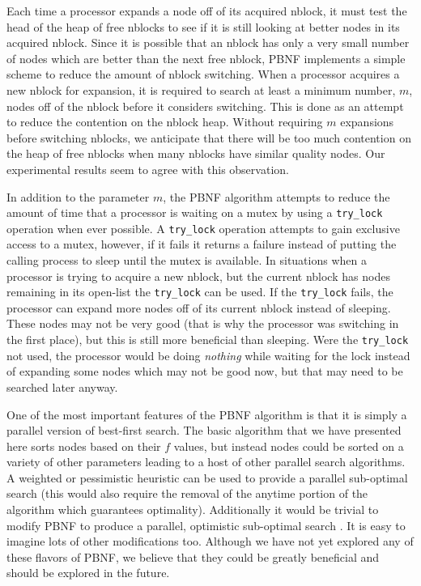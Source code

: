 \documentclass{article}
\begin{document}
 Each time a processor expands a node off of its acquired nblock, it
 must test the head of the heap of free nblocks to see if it is still
 looking at better nodes in its acquired nblock.  Since it is possible
 that an nblock has only a very small number of nodes which are better
 than the next free nblock, PBNF implements a simple scheme to reduce
 the amount of nblock switching.  When a processor acquires a new
 nblock for expansion, it is required to search at least a minimum
 number, $m$, nodes off of the nblock before it considers switching.
 This is done as an attempt to reduce the contention on the nblock
 heap.  Without requiring $m$ expansions before switching nblocks, we
 anticipate that there will be too much contention on the heap of free
 nblocks when many nblocks have similar quality nodes.  Our
 experimental results seem to agree with this observation.

 In addition to the parameter $m$, the PBNF algorithm attempts to
 reduce the amount of time that a processor is waiting on a mutex by
 using a \texttt{try\_lock} operation when ever possible.  A
 \texttt{try\_lock} operation attempts to gain exclusive access to a
 mutex, however, if it fails it returns a failure instead of putting
 the calling process to sleep until the mutex is available.  In
 situations when a processor is trying to acquire a new nblock, but the
 current nblock has nodes remaining in its open-list the
 \texttt{try\_lock} can be used.  If the \texttt{try\_lock} fails, the
 processor can expand more nodes off of its current nblock instead of
 sleeping.  These nodes may not be very good (that is why the processor
 was switching in the first place), but this is still more beneficial
 than sleeping.  Were the \texttt{try\_lock} not used, the processor
 would be doing \emph{nothing} while waiting for the lock instead of
 expanding some nodes which may not be good now, but that may need to
 be searched later anyway.

 One of the most important features of the PBNF algorithm is that it is
 simply a parallel version of best-first search.  The basic algorithm
 that we have presented here sorts nodes based on their $f$ values, but
 instead nodes could be sorted on a variety of other parameters leading
 to a host of other parallel search algorithms.  A weighted or
 pessimistic heuristic can be used to provide a parallel sub-optimal
 search (this would also require the removal of the anytime portion of
 the algorithm which guarantees optimality).  Additionally it would be
 trivial to modify PBNF to produce a parallel, optimistic sub-optimal
 search \cite{thayer:fas}.  It is easy to imagine lots of other
 modifications too.  Although we have not yet explored any of these
 flavors of PBNF, we believe that they could be greatly beneficial and
 should be explored in the future.
\end{document}
